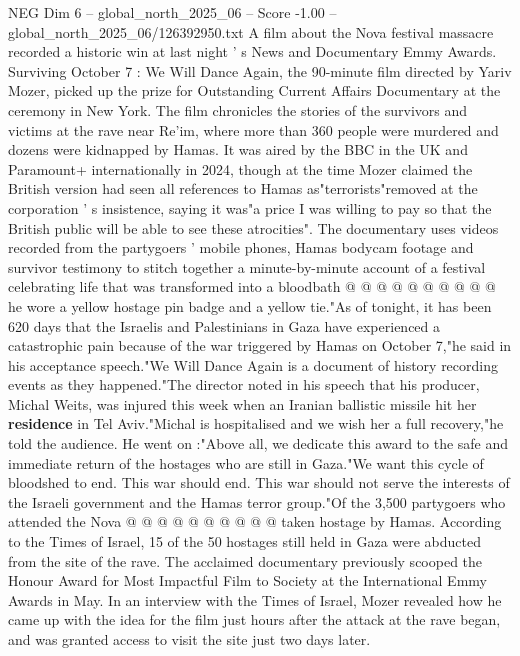 \begin{textsample}{NEG Dim 6 – global\_north\_2025\_06 – Score -1.00 – global\_north\_2025\_06/126392950.txt}  \label{ex:f6_neg_428}
A film about the Nova festival massacre recorded a historic win at last night ' s News and Documentary Emmy Awards.
Surviving October 7 : We Will Dance Again, the 90-minute film directed by Yariv Mozer, picked up the prize for Outstanding Current Affairs Documentary at the ceremony in New York.
The film chronicles the stories of the survivors and victims at the rave near Re'im, where more than 360 people were murdered and dozens were kidnapped by Hamas.
It was aired by the BBC in the UK and Paramount+ internationally in 2024, though at the time Mozer claimed the British version had seen all references to Hamas as"terrorists"removed at the corporation ' s insistence, saying it was"a price I was willing to pay so that the British public will be able to see these atrocities".
The documentary uses videos recorded from the partygoers ' mobile phones, Hamas bodycam footage and survivor testimony to stitch together a minute-by-minute account of a festival celebrating life that was transformed into a bloodbath @ @ @ @ @ @ @ @ @ @ he wore a yellow hostage pin badge and a yellow tie."As of tonight, it has been 620 days that the Israelis and Palestinians in Gaza have experienced a catastrophic pain because of the war triggered by Hamas on October 7,"he said in his acceptance speech."We Will Dance Again is a document of history recording events as they happened."The director noted in his speech that his producer, Michal Weits, was injured this week when an Iranian ballistic missile hit her \textbf{residence} in Tel Aviv."Michal is hospitalised and we wish her a full recovery,"he told the audience.
He went on :"Above all, we dedicate this award to the safe and immediate return of the hostages who are still in Gaza."We want this cycle of bloodshed to end.
This war should end.
This war should not serve the interests of the Israeli government and the Hamas terror group."Of the 3,500 partygoers who attended the Nova @ @ @ @ @ @ @ @ @ @ taken hostage by Hamas.
According to the Times of Israel, 15 of the 50 hostages still held in Gaza were abducted from the site of the rave.
The acclaimed documentary previously scooped the Honour Award for Most Impactful Film to Society at the International Emmy Awards in May.
In an interview with the Times of Israel, Mozer revealed how he came up with the idea for the film just hours after the attack at the rave began, and was granted access to visit the site just two days later.

\end{textsample}
